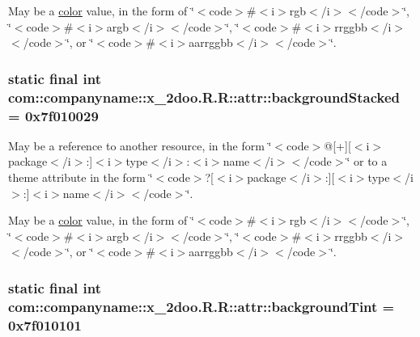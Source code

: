 May be a \hyperlink{classcom_1_1companyname_1_1x__2doo_1_1_r_1_1color}{color} value, in the form of \char`\"{}$<$code$>$\#$<$i$>$rgb$<$/i$>$$<$/code$>$\char`\"{}, \char`\"{}$<$code$>$\#$<$i$>$argb$<$/i$>$$<$/code$>$\char`\"{}, \char`\"{}$<$code$>$\#$<$i$>$rrggbb$<$/i$>$$<$/code$>$\char`\"{}, or \char`\"{}$<$code$>$\#$<$i$>$aarrggbb$<$/i$>$$<$/code$>$\char`\"{}. \hypertarget{classcom_1_1companyname_1_1x__2doo_1_1_r_1_1attr_34699025aead7061586c9065b72903df}{
\subsubsection[{backgroundStacked}]{\setlength{\rightskip}{0pt plus 5cm}static final int com::companyname::x\_\-2doo.R.R::attr::backgroundStacked = 0x7f010029}}
\label{classcom_1_1companyname_1_1x__2doo_1_1_r_1_1attr_34699025aead7061586c9065b72903df}


May be a reference to another resource, in the form \char`\"{}$<$code$>$@\mbox{[}+\mbox{]}\mbox{[}$<$i$>$package$<$/i$>$:\mbox{]}$<$i$>$type$<$/i$>$:$<$i$>$name$<$/i$>$$<$/code$>$\char`\"{} or to a theme attribute in the form \char`\"{}$<$code$>$?\mbox{[}$<$i$>$package$<$/i$>$:\mbox{]}\mbox{[}$<$i$>$type$<$/i$>$:\mbox{]}$<$i$>$name$<$/i$>$$<$/code$>$\char`\"{}. 

May be a \hyperlink{classcom_1_1companyname_1_1x__2doo_1_1_r_1_1color}{color} value, in the form of \char`\"{}$<$code$>$\#$<$i$>$rgb$<$/i$>$$<$/code$>$\char`\"{}, \char`\"{}$<$code$>$\#$<$i$>$argb$<$/i$>$$<$/code$>$\char`\"{}, \char`\"{}$<$code$>$\#$<$i$>$rrggbb$<$/i$>$$<$/code$>$\char`\"{}, or \char`\"{}$<$code$>$\#$<$i$>$aarrggbb$<$/i$>$$<$/code$>$\char`\"{}. \hypertarget{classcom_1_1companyname_1_1x__2doo_1_1_r_1_1attr_8893d15496aa78adf7f63c789d335c3b}{
\subsubsection[{backgroundTint}]{\setlength{\rightskip}{0pt plus 5cm}static final int com::companyname::x\_\-2doo.R.R::attr::backgroundTint = 0x7f010101}}
\label{classcom_1_1companyname_1_1x__2doo_1_1_r_1_1attr_8893d15496aa78adf7f63c789d335c3b}



